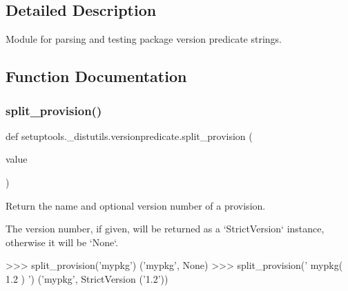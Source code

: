 \subsection{Detailed Description}
\begin{DoxyVerb}Module for parsing and testing package version predicate strings.
\end{DoxyVerb}
 

\subsection{Function Documentation}
\mbox{\label{namespacesetuptools_1_1__distutils_1_1versionpredicate_af4072cfd07f97b5b71a42d2c9de5a8cf}} 
\subsubsection{\texorpdfstring{split\+\_\+provision()}{split\_provision()}}
{\footnotesize\ttfamily def setuptools.\+\_\+distutils.\+versionpredicate.\+split\+\_\+provision (\begin{DoxyParamCaption}\item[{}]{value }\end{DoxyParamCaption})}

\begin{DoxyVerb}Return the name and optional version number of a provision.

The version number, if given, will be returned as a `StrictVersion`
instance, otherwise it will be `None`.

>>> split_provision('mypkg')
('mypkg', None)
>>> split_provision(' mypkg( 1.2 ) ')
('mypkg', StrictVersion ('1.2'))
\end{DoxyVerb}
 \mbox{\label{namespacesetuptools_1_1__distutils_1_1versionpredicate_aef106f185adf3667cf513ee0af81c8fa}} 
